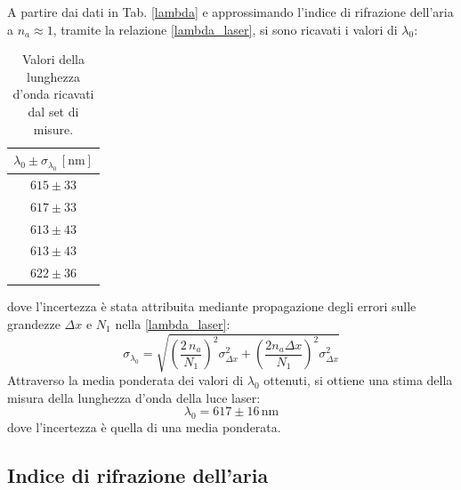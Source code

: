 \documentclass[]{article}
\let\oldsubsection\subsection%
\renewcommand{\subsection}{%
	\renewcommand{\theequation}{\thesubsection.\arabic{equation}}%
	\oldsubsection}%
\begin{document}
A partire dai dati in Tab. \ref{lambda} e approssimando l'indice di rifrazione dell'aria a $n_a \approx 1$, tramite la relazione \ref{lambda_laser}, si sono ricavati i valori di $\lambda_0$:

\begin{table}[H]
    \centering
    
    \begin{tabular}{||c||}
        \hline
        $\lambda_0 \pm \sigma_{\lambda_0} \, \left[\text{nm}\right]$ \\
        \hline\hline

        $615 \pm 33$ \\\hline
        $617 \pm 33$ \\\hline
        $613 \pm 43$ \\\hline
        $613 \pm 43$ \\\hline
        $622 \pm 36$ \\\hline
    
    \end{tabular}
    \caption{Valori della lunghezza d'onda ricavati dal set di misure.}
    \label{tab:lambda}
\end{table}
dove l'incertezza è stata attribuita mediante propagazione degli errori sulle grandezze $\Delta x$ e $N_1$ nella \ref{lambda_laser}:
\begin{equation}
\label{err-lambda}
\sigma_{\lambda_0} = \sqrt{ \left( \frac{2 \, n_a}{N_1}\right)^2 \sigma^2_{\Delta x} +  \left(\frac{2 n_a \Delta x}{N_1} \right)^2 \sigma^2_{\Delta x} }
\end{equation}
Attraverso la media ponderata dei valori di $\lambda_0$ ottenuti, si ottiene una stima della misura della lunghezza d'onda della luce laser:
\begin{equation}
\label{lambda-value}
\lambda_0 = 617 \pm 16 \, \text{nm}
\end{equation}
dove l'incertezza è quella di una media ponderata.

\subsection{Indice di rifrazione dell'aria}
\end{document}
